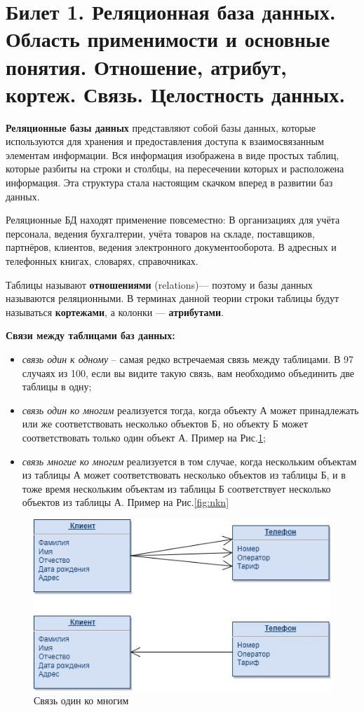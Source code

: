 \newpage
\section{Билет 1. Реляционная база данных. Область применимости и основные понятия. Отношение, атрибут, кортеж. Связь. Целостность данных.}

\textbf{Реляционные базы данных} представляют собой базы данных, которые используются для хранения и предоставления доступа к взаимосвязанным элементам информации. Вся информация изображена в виде простых таблиц, которые разбиты на строки и столбцы, на пересечении которых и расположена информация. Эта структура стала настоящим скачком вперед в развитии баз данных.

Реляционные БД находят применение повсеместно: В организациях для учёта персонала, ведения бухгалтерии, учёта товаров на складе, поставщиков, партнёров, клиентов, ведения электронного документооборота. В адресных и телефонных книгах, словарях, справочниках.

Таблицы называют \textbf{отношениями} (relations)— поэтому и базы данных называются реляционными. В терминах данной теории строки таблицы будут называться \textbf{кортежами}, а колонки — \textbf{атрибутами}.

\textbf{Связи между таблицами баз данных:}
\begin{itemize}
    \item \textit{связь один к одному} – самая редко встречаемая связь между таблицами. В 97 случаях из 100, если вы видите такую связь, вам необходимо объединить две таблицы в одну;
    \item \textit{связь один ко многим} реализуется тогда, когда объекту А может принадлежать или же соответствовать несколько объектов Б, но объекту Б может соответствовать только один объект А. Пример на Рис.\ref{fig:onekn};
    \item \textit{связь многие ко многим} реализуется в том случае, когда нескольким объектам из таблицы А может соответствовать несколько объектов из таблицы Б, и в тоже время нескольким объектам из таблицы Б соответствует несколько объектов из таблицы А. Пример на Рис.\ref{fig:nkn}
\end{itemize}

\begin{figure}[!h]
    \centering
    \includegraphics[scale = 0.5]{1/1kn.jpg}
    \caption{Связь один ко многим}
    \label{fig:onekn}
\end{figure}

